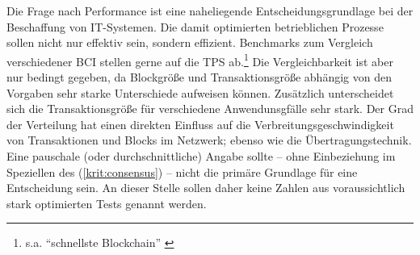Die Frage nach Performance ist eine naheliegende Entscheidungsgrundlage bei der Beschaffung von IT-Systemen.
Die damit optimierten betrieblichen Prozesse sollen nicht nur effektiv sein, sondern effizient.
Benchmarks zum Vergleich verschiedener \gls{BCI} stellen gerne auf die \gls{TPS} ab.\footnote{s.a. \enquote{schnellste Blockchain} \autocite{w:rbbc}}
Die Vergleichbarkeit ist aber nur bedingt gegeben, da Blockgröße und Transaktionsgröße abhängig von den Vorgaben sehr starke Unterschiede aufweisen können.
Zusätzlich unterscheidet sich die Transaktionsgröße für verschiedene Anwendunsgfälle sehr stark.
Der Grad der Verteilung hat einen direkten Einfluss auf die Verbreitungsgeschwindigkeit von Transaktionen und Blocks im Netzwerk; ebenso wie die Übertragungstechnik.
Eine pauschale (oder durchschnittliche) Angabe sollte -- ohne Einbeziehung im Speziellen des  (\ref{krit:consensus}) -- nicht die primäre Grundlage für eine Entscheidung sein. An dieser Stelle sollen daher keine Zahlen aus voraussichtlich stark optimierten Tests genannt werden.






